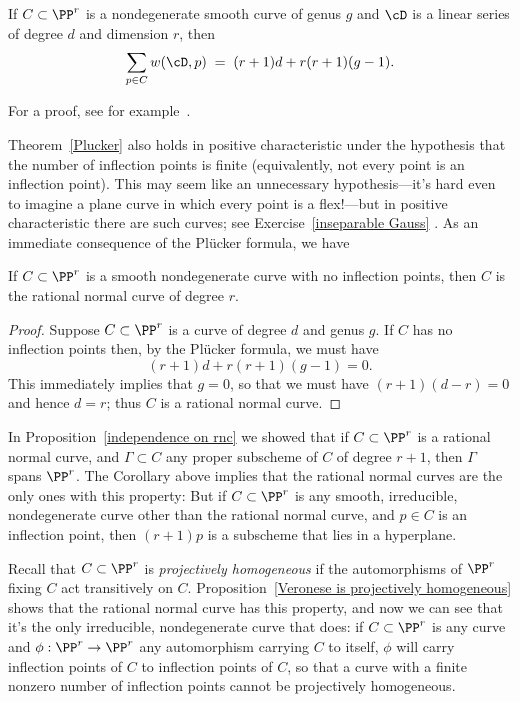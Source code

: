 \begin{theorem}\label{Plucker}
If $C \subset \PP^r$ is a nondegenerate smooth curve of genus $g$ and $\cD$ is a
linear series of degree $d$ and dimension $r$, then
 \begin{equation}\label{Plucker formula}
\sum_{p \in C} w(\cD, p) \; = \; (r+1)d + r(r+1)(g-1).
\end{equation}
\end{theorem}
For a proof, see for example~\cite[Theorem 7.13]{allthat}.

Theorem~\ref{Plucker} also holds in positive characteristic under the hypothesis that the number of inflection points is finite (equivalently, not every point is an inflection point). This may seem like an unnecessary hypothesis---it's hard even to imagine a plane curve in which every point is a flex!---but in positive characteristic there are such curves; see Exercise~\ref{inseparable Gauss} .
As an immediate consequence of the Pl\"ucker formula, we have

\begin{corollary}\label{uninflected curves}
 If $C\subset \PP^r$ is a smooth nondegenerate curve with no inflection points, then $C$ is the rational normal curve of degree $r$. 
\end{corollary}

\begin{proof}
Suppose $C \subset \PP^r$ is a curve of degree $d$ and genus $g$. If $C$ has no inflection points then, by the Pl\"ucker formula, we must have
$$
(r+1)d + r(r+1)(g-1) = 0.
$$
This immediately implies that $g=0$, so that we must have $(r+1)(d-r) = 0$ and hence $d=r$; thus $C$ is a rational normal curve.
\end{proof}

In Proposition~\ref{independence on rnc} we showed that if $C \subset \PP^r$ is a rational normal curve, and $\Gamma \subset C$ any proper subscheme of $C$ of degree $r+1$, then $\Gamma$ spans $\PP^r$. The Corollary above implies that the
rational normal curves are the only ones with this property:
But if $C \subset \PP^r$ is any smooth, irreducible, nondegenerate curve other than the rational normal curve,
 and $p \in C$ is an inflection point, then $(r+1)p$ is  a subscheme that lies in a hyperplane. 

Recall that $C\subset \PP^r$ is \emph{projectively homogeneous} if the automorphisms of $\PP^r$ fixing
$C$ act transitively on $C$.  Proposition~\ref{Veronese is projectively homogeneous} shows that the rational normal curve has this property, and now we can see that it's the only irreducible, nondegenerate curve that does: if $C \subset \PP^r$ is any curve and $\phi : \PP^r \to \PP^r$ any automorphism carrying $C$ to itself, $\phi$ will carry inflection points of $C$ to inflection points of $C$, so that a curve with a finite nonzero number of inflection points cannot be projectively homogeneous.

